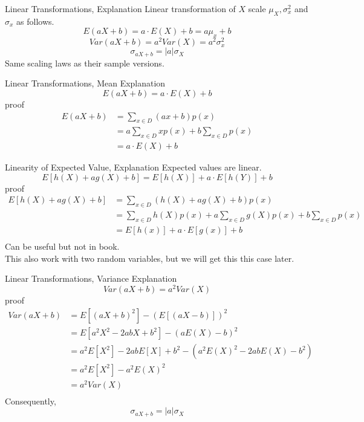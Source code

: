 \documentclass[handout]{beamer}
\newcommand{\nl}[1]{\vspace{#1 em}}
\begin{document}
\begin{frame}{Linear Transformations, Explanation}
    Linear transformation of $X$ scale $\mu_X, \sigma^2_x$ and $\sigma_x$ as follows.
        $$ E(aX + b) = a \cdot E(X) + b = a \mu_x + b$$
        $$ Var(aX + b) = a^2 Var(X) = a^2 \sigma^2_x$$
        $$ \sigma_{aX +b} = |a| \sigma_X$$
    Same scaling laws as their sample versions.
\end{frame}

\begin{frame}{Linear Transformations, Mean Explanation}
    $$ E(aX + b) = a \cdot E(X) + b $$
    proof
    \begin{align*}
        E(aX + b) & = \sum_{x \in D} (a x+ b) p(x) \\
        & = a \sum_{x \in D} x p(x)+  b \sum_{x \in D} p(x) \\
        & = a \cdot E(X) + b
    \end{align*}
\end{frame}

\begin{frame}{Linearity of Expected Value, Explanation}
    Expected values are linear.
    $$ E[h(X) + ag(X) + b] = E[h(X)] + a\cdot E[h(Y)] + b$$
    proof
    \begin{align*}
        E[h(X) + ag(X) + b] & = \sum_{x \in D} (h(X) + ag(X) + b)p(x)\\
        & = \sum_{x \in D} h(X)p(x) + a \sum_{x \in D} g(X) p(x) + b \sum_{x \in D} p(x)\\
        & = E[h(x)] + a\cdot E[g(x)] + b\\
    \end{align*}
    Can be useful but not in book.\\ \nl{0.5}
    This also work with two random variables, but we will get this this case later.
\end{frame}

\begin{frame}{Linear Transformations, Variance Explanation}
    $$ Var(aX + b) = a^2 Var(X) $$
    proof
    \begin{align*}
        Var(aX + b) &= E[(aX + b)^2] - (E[(aX -b)])^2\\
        & =E[a^2 X^2 -2 abX + b^2] - (a E(X) - b)^2\\
        & =a^2 E[X^2] -2 abE[X] + b^2 - (a^2 E(X)^2 -2abE(X) - b^2)\\
        & =a^2 E[X^2] -a^2 E(X)^2 \\
        & = a^2 Var(X)\\
    \end{align*}
    Consequently,
    $$\sigma_{aX+b} = |a|\sigma_X$$
\end{frame}
\end{document}
